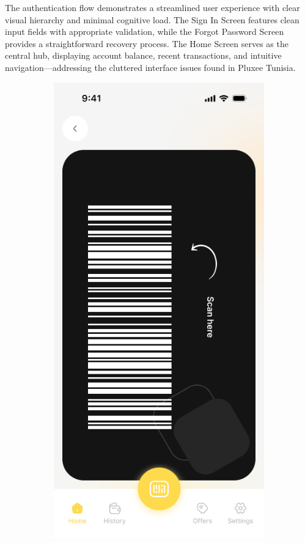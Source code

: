 The authentication flow demonstrates a streamlined user experience with clear visual hierarchy and minimal cognitive load. The Sign In Screen features clean input fields with appropriate validation, while the Forgot Password Screen provides a straightforward recovery process. The Home Screen serves as the central hub, displaying account balance, recent transactions, and intuitive navigation—addressing the cluttered interface issues found in Pluxee Tunisia.

\begin{figure}[H]
    \centering
    \begin{subfigure}[b]{0.32\textwidth}
        \centering
        \includegraphics[width=\textwidth]{images/scan_screen.png}

\end{subfigure}
\end{figure}
